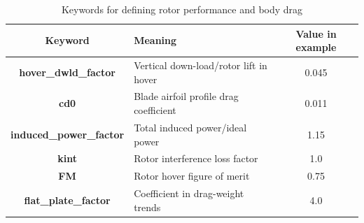 \begin{center}
  \begin{table}[H]
	\caption{Keywords for defining rotor performance and body drag}
	\label{tbl:aero_keywords}
    \begin{tabular}{| c | l | c |}
    \hline
    Keyword & Meaning & Value in example \\ 
    \hline
\textbf{hover\_dwld\_factor} & Vertical down-load/rotor lift in hover & 0.045  \\
\textbf{cd0} & Blade airfoil profile drag coefficient & 0.011  \\
\textbf{induced\_power\_factor} & Total induced power/ideal power & 1.15 \\
\textbf{kint} & Rotor interference loss factor & 1.0 \\
\textbf{FM} & Rotor hover figure of merit & 0.75 \\
\textbf{flat\_plate\_factor} & Coefficient in drag-weight trends & 4.0 \\
     \hline
  \end{tabular}
\end{table}
\end{center}
